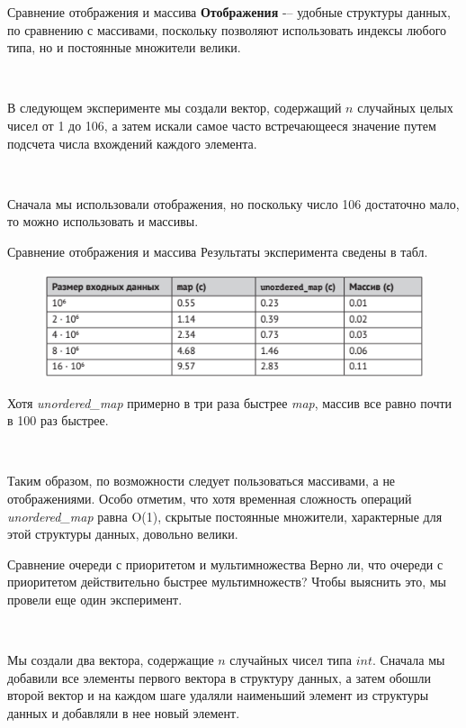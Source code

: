 \documentclass{beamer}
\begin{document}
\begin{frame}[fragile]{Сравнение отображения и массива}
    \textbf{Отображения} -– удобные структуры данных, по сравнению с массивами, поскольку позволяют использовать индексы любого типа, но и постоянные множители велики. 

    ~
    
    В следующем эксперименте мы создали вектор, содержащий $n$ случайных целых чисел от 1 до 106, а затем искали самое часто встречающееся значение путем подсчета числа вхождений каждого элемента. 
    
    ~
    
    Сначала мы использовали отображения, но поскольку число 106 достаточно мало, то можно использовать и массивы.
\end{frame}

\begin{frame}[fragile]{Сравнение отображения и массива}
    Результаты эксперимента сведены в табл. 
    
    \begin{figure}[h]
		\centering
		\includegraphics[scale=0.75]{images/lec11-pic03.png}
	\end{figure}

    Хотя \textit{unordered\_map} примерно в три раза быстрее \textit{map}, массив все равно почти в 100 раз быстрее.
    
    ~
    
    Таким образом, по возможности следует пользоваться массивами, а не отображениями. Особо отметим, что хотя временная сложность операций \textit{unordered\_map} равна O(1), скрытые постоянные множители, характерные для этой структуры данных, довольно велики.
\end{frame}

\begin{frame}[fragile]{Сравнение очереди с приоритетом и мультимножества}
    Верно ли, что очереди с приоритетом действительно быстрее мультимножеств? Чтобы выяснить это, мы провели еще один эксперимент. 
    
    ~
    
    Мы создали два вектора, содержащие $n$ случайных чисел типа $int$. Сначала мы добавили все элементы первого вектора в структуру данных, а затем обошли второй вектор и на каждом шаге удаляли наименьший элемент из структуры данных и добавляли в нее новый элемент.
\end{frame}
\end{document}
